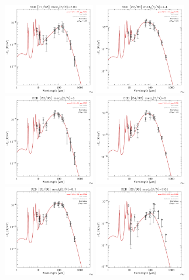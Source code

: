 \documentclass[preprint2,longabstract]{aastex}
\begin{document}
\begin{figure}
\centering
    \includegraphics[trim=0 2mm 0 0, clip, width=40mm]{SEDs/sed_21.pdf}
	\includegraphics[trim=0 2mm 0 0, clip, width=40mm]{SEDs/sed_22.pdf}
	\includegraphics[trim=0 2mm 0 0, clip, width=40mm]{SEDs/sed_23.pdf}
	\includegraphics[trim=0 2mm 0 0, clip, width=40mm]{SEDs/sed_24.pdf}
	\includegraphics[trim=0 2mm 0 0, clip, width=40mm]{SEDs/sed_25.pdf}
	\includegraphics[trim=0 2mm 0 0, clip, width=40mm]{SEDs/sed_26.pdf}

\end{figure}
\end{document}
